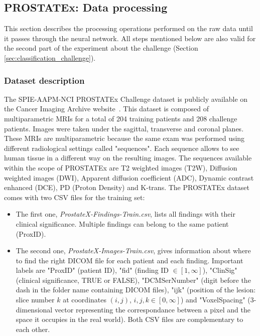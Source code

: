 \subsection{PROSTATEx: Data processing}
\label{sec:prostatex_data_processing}
\setlength{\marginparwidth}{3cm}\leavevmode {}This section describes the processing operations performed on the raw data until it passes through the neural network. All steps mentioned below are also valid for the second part of the experiment about the challenge (Section \ref{sec:classification_challenge}).


\subsubsection{Dataset description}
\label{sec:prostatex_dataset_description}
\setlength{\marginparwidth}{3cm}\leavevmode {}The SPIE-AAPM-NCI PROSTATEx Challenge dataset is publicly available on the Cancer Imaging Archive website~\cite{33, 34, 35}. This dataset is composed of multiparametric MRIs for a total of 204 training patients and 208 challenge patients. Images were taken under the sagittal, transverse and coronal planes. These MRIs are multiparametric because the same exam was performed using different radiological settings called "sequences". Each sequence allows to see human tissue in a different way on the resulting images. The sequences available within the scope of PROSTATEx are T2 weighted images (T2W), Diffusion weighted images (DWI), Apparent diffusion coefficient (ADC), Dynamic contrast enhanced (DCE), PD (Proton Density) and K-trans. The PROSTATEx dataset comes with two CSV files for the training set:
\begin{itemize}
\item The first one, \textit{ProstateX-Findings-Train.csv}, lists all findings with their clinical significance. Multiple findings can belong to the same patient (ProxID).

\item The second one, \textit{ProstateX-Images-Train.csv}, gives information about where to find the right DICOM file for each patient and each finding. Important labels are "ProxID" (patient ID), "fid" (finding ID $\in [1,\infty]$), "ClinSig" (clinical significance, TRUE or FALSE), "DCMSerNumber" (digit before the dash in the folder name containing DICOM files), "ijk" (position of the lesion: slice number $k$ at coordinates $(i,j)$, $i,j,k \in [0,\infty]$) and "VoxelSpacing" (3-dimensional vector representing the correspondance between a pixel and the space it occupies in the real world). Both CSV files are complementary to each other. 
\end{itemize}

